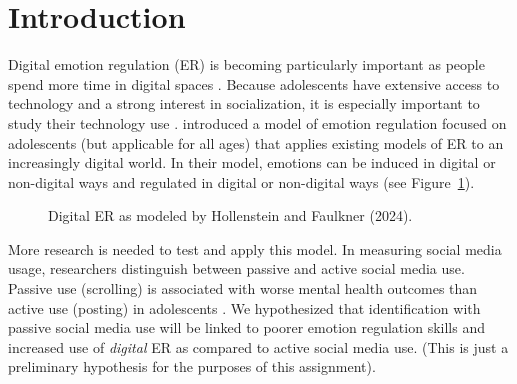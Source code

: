 \section{Introduction}
Digital emotion regulation (ER) is becoming particularly important as people spend more time in digital spaces \citep{hollensteinreview2024}. Because adolescents have extensive access to technology and a strong interest in socialization, it is especially important to study their technology use \citep{orben2020review}. \citet{hollensteinreview2024} introduced a model of emotion regulation focused on adolescents (but applicable for all ages) that applies existing models of ER to an increasingly digital world. In their model, emotions can be induced in digital or non-digital ways and regulated in digital or non-digital ways (see Figure~\ref{fig:TikZpicture}). 
\begin{center}
    \begin{figure}
        \centering
        \caption{Digital ER as modeled by Hollenstein and Faulkner (2024).}
        \label{fig:TikZpicture}
  \end{figure}
\end{center}
More research is needed to test and apply this model. In measuring social media usage, researchers distinguish between passive and active social media use. Passive use (scrolling) is associated with worse mental health outcomes than active use (posting) in adolescents \citep{Thorisdottir}. We hypothesized that identification with passive social media use will be linked to poorer emotion regulation skills and increased use of \textit{digital} ER as compared to active social media use. (This is just a preliminary hypothesis for the purposes of this assignment).



